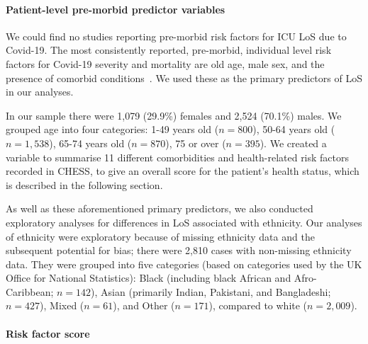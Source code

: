 \documentclass[review]{elsarticle}
\begin{document}
\paragraph{Patient-level pre-morbid predictor variables}

We could find no studies reporting pre-morbid risk factors for ICU LoS due to Covid-19. The most consistently reported, pre-morbid, individual level risk factors for Covid-19 severity and mortality are old age, male sex, and the presence of comorbid conditions~\cite{jordan2020covid,phua2020intensive,porcheddu2020similarity,wu2020characteristics}. We used these as the primary predictors of LoS in our analyses.  

In our sample there were 1,079 (29.9\%) females and 2,524 (70.1\%) males. We grouped age into four categories: 1-49 years old ($n = 800$), 50-64 years old ($n = 1,538$), 65-74 years old ($n = 870$), 75 or over ($n = 395$). We created a variable to summarise 11 different comorbidities and health-related risk factors recorded in CHESS, to give an overall score for the patient’s health status, which is described in the following section.


As well as these aforementioned primary predictors, we also conducted exploratory analyses for differences in LoS associated with ethnicity. Our analyses of ethnicity were exploratory because of missing ethnicity data and the subsequent potential for bias; there were 2,810 cases with non-missing ethnicity data. They were grouped into five categories (based on categories used by the UK Office for National Statistics): Black (including black African and Afro-Caribbean; $n = 142$), Asian (primarily Indian, Pakistani, and Bangladeshi; $n = 427$), Mixed ($n = 61$), and Other ($n = 171$), compared to white ($n = 2,009$).

\paragraph{Risk factor score}
\end{document}
